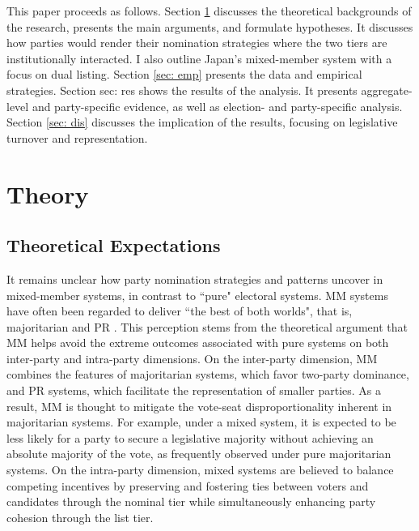 \documentclass[a4paper, 11pt]{article}
\begin{document}
This paper proceeds as follows. Section \ref{sec: the} discusses the theoretical backgrounds of the research, presents the main arguments, and formulate hypotheses. It discusses how parties would render their nomination strategies where the two tiers are institutionally interacted. I also outline Japan's mixed-member system with a focus on dual listing. Section \ref{sec: emp} presents the data and empirical strategies. Section {sec: res} shows the results of the analysis. It presents aggregate-level and party-specific evidence, as well as election- and party-specific analysis. Section \ref{sec: dis} discusses the implication of the results, focusing on legislative turnover and representation. 

\section{Theory} \label{sec: the}

\subsection{Theoretical Expectations}

It remains unclear how party nomination strategies and patterns uncover in mixed-member systems, in contrast to ``pure" electoral systems. MM systems have often been regarded to deliver ``the best of both worlds", that is, majoritarian and PR \citep{shugartMixedmemberElectoralSystems2003, hiranoPolicyPositionsMixed2011}. This perception stems from the theoretical argument that MM helps avoid the extreme outcomes associated with pure systems on both inter-party and intra-party dimensions. On the inter-party dimension, MM combines the features of majoritarian systems, which favor two-party dominance, and PR systems, which facilitate the representation of smaller parties. As a result, MM is thought to mitigate the vote-seat disproportionality inherent in majoritarian systems. For example, under a mixed system, it is expected to be less likely for a party to secure a legislative majority without achieving an absolute majority of the vote, as frequently observed under pure majoritarian systems. On the intra-party dimension, mixed systems are believed to balance competing incentives by preserving and fostering ties between voters and candidates through the nominal tier while simultaneously enhancing party cohesion through the list tier.
\end{document}
